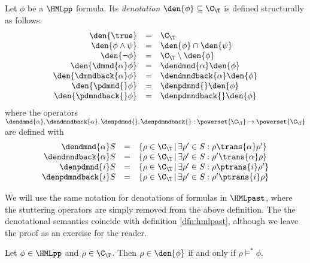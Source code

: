 \begin{definition}
    \label{dfn:hmlppsemantics}

    Let $\phi$ be a $\HMLpp$ formula. Its {\em denotation} $\den{\phi}\subseteq \C_\T$ 
    is defined structurally as follows.
    \[
    \begin{array}{r@{\quad}c@{\quad}l}
        \den{\true} &=&  \C_\T \\
        \den{\phi\land\psi} &=& \den{\phi} \cap \den{\psi} \\
        \den{\neg\phi} &=& \C_\T \setminus \den{\phi} \\
        \den{\dmnd{\alpha}\phi} &=& \dendmnd{\alpha}\den{\phi} \\
        \den{\dmndback{\alpha}\phi} &=& \dendmndback{\alpha}\den{\phi} \\
        \den{\pdmnd{}\phi} &=& \denpdmnd{}\den{\phi} \\
        \den{\pdmndback{}\phi} &=& \denpdmndback{}\den{\phi} \\
    \end{array}
    \]
    where the operators $\dendmnd{\alpha}, \dendmndback{\alpha},
    \denpdmnd{}, \denpdmndback{} : \powerset{\C_\T} \rightarrow \powerset{\C_\T}$
    are defined with
    \[
    \begin{array}{r@{\quad}c@{\quad}l}
        \dendmnd{\alpha}S &=& \{ \rho \in \C_\T \,|\, \exists \rho'\in S : \rho \trans{\alpha} \rho' \} \\
        \dendmndback{\alpha}S &=& \{ \rho \in \C_\T \,|\, \exists \rho'\in S : \rho' \trans{\alpha} \rho \} \\
        \denpdmnd{i}S &=& \{ \rho \in \C_\T \,|\, \exists \rho'\in S : \rho \ptrans{i} \rho' \} \\
        \denpdmndback{i}S &=& \{ \rho \in \C_\T \,|\, \exists \rho'\in S : \rho' \ptrans{i} \rho \} \\
    \end{array}
    \]
\end{definition}

We will use the same notation for denotations of formulas in $\HMLpast$, where
the stuttering operators are simply removed from the above definition.
The the denotational semantics coincide with definition \ref{dfn:hmlpast},
although we leave the proof as an exercise for the reader.

\begin{lemma}
    Let $\phi \in \HMLpp$ and $\rho \in \C_\T$. Then $\rho\in\den{\phi}$ if
    and only if $\rho \vDash^* \phi$.
\end{lemma}

